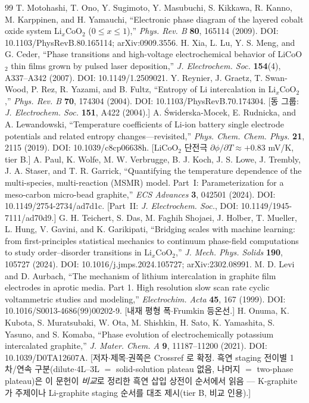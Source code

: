 \documentclass[11pt,a4paper]{article}
\begin{document}
\begin{thebibliography}{99}
 T. Motohashi, T. Ono, Y. Sugimoto, Y. Masubuchi, S. Kikkawa, R. Kanno, M. Karppinen, and H. Yamauchi, ``Electronic phase diagram of the layered cobalt oxide system Li$_x$CoO$_2$ ($0\le x\le1$),'' \emph{Phys. Rev. B} \textbf{80}, 165114 (2009). DOI: 10.1103/PhysRevB.80.165114; arXiv:0909.3556.
 H. Xia, L. Lu, Y. S. Meng, and G. Ceder, ``Phase transitions and high-voltage electrochemical behavior of LiCoO$_2$ thin films grown by pulsed laser deposition,'' \emph{J. Electrochem. Soc.} \textbf{154}(4), A337--A342 (2007). DOI: 10.1149/1.2509021.
 Y. Reynier, J. Graetz, T. Swan-Wood, P. Rez, R. Yazami, and B. Fultz, ``Entropy of Li intercalation in Li$_x$CoO$_2$,'' \emph{Phys. Rev. B} \textbf{70}, 174304 (2004). DOI: 10.1103/PhysRevB.70.174304. [동 그룹: \emph{J. Electrochem. Soc.} \textbf{151}, A422 (2004).]
 A. {\'S}widerska-Mocek, E. Rudnicka, and A. Lewandowski, ``Temperature coefficients of Li-ion battery single electrode potentials and related entropy changes---revisited,'' \emph{Phys. Chem. Chem. Phys.} \textbf{21}, 2115 (2019). DOI: 10.1039/c8cp06638h. [LiCoO$_2$ 단전극 $\partial\phi/\partial T\approx+0.83$ mV/K, tier B.]
 A. Paul, K. Wolfe, M. W. Verbrugge, B. J. Koch, J. S. Lowe, J. Trembly, J. A. Staser, and T. R. Garrick, ``Quantifying the temperature dependence of the multi-species, multi-reaction (MSMR) model. Part~I: Parameterization for a meso-carbon micro-bead graphite,'' \emph{ECS Advances} \textbf{3}, 042501 (2024). DOI: 10.1149/2754-2734/ad7d1c. [Part~II: \emph{J. Electrochem. Soc.}, DOI: 10.1149/1945-7111/ad70d9.]
 G. H. Teichert, S. Das, M. Faghih Shojaei, J. Holber, T. Mueller, L. Hung, V. Gavini, and K. Garikipati, ``Bridging scales with machine learning: from first-principles statistical mechanics to continuum phase-field computations to study order--disorder transitions in Li$_x$CoO$_2$,'' \emph{J. Mech. Phys. Solids} \textbf{190}, 105727 (2024). DOI: 10.1016/j.jmps.2024.105727; arXiv:2302.08991.
 M. D. Levi and D. Aurbach, ``The mechanism of lithium intercalation in graphite film electrodes in aprotic media. Part 1. High resolution slow scan rate cyclic voltammetric studies and modeling,'' \emph{Electrochim. Acta} \textbf{45}, 167 (1999). DOI: 10.1016/S0013-4686(99)00202-9. [내재 평형 폭$\cdot$Frumkin 등온선.]
 H. Onuma, K. Kubota, S. Muratsubaki, W. Ota, M. Shishkin, H. Sato, K. Yamashita, S. Yasuno, and S. Komaba, ``Phase evolution of electrochemically potassium intercalated graphite,'' \emph{J. Mater. Chem. A} \textbf{9}, 11187--11200 (2021). DOI: 10.1039/D0TA12607A. [저자$\cdot$제목$\cdot$권쪽은 Crossref 로 확정. 흑연 staging 전이별 1차/연속 구분(dilute$\cdot$4L--3L $=$ solid-solution plateau 없음, 나머지 $=$ two-phase plateau)은 이 문헌이 \emph{비교}로 정리한 흑연 삽입 상전이 순서에서 읽음 — K-graphite 가 주제이나 Li-graphite staging 순서를 대조 제시(tier B, 비교 인용).]

\end{thebibliography}
\end{document}
